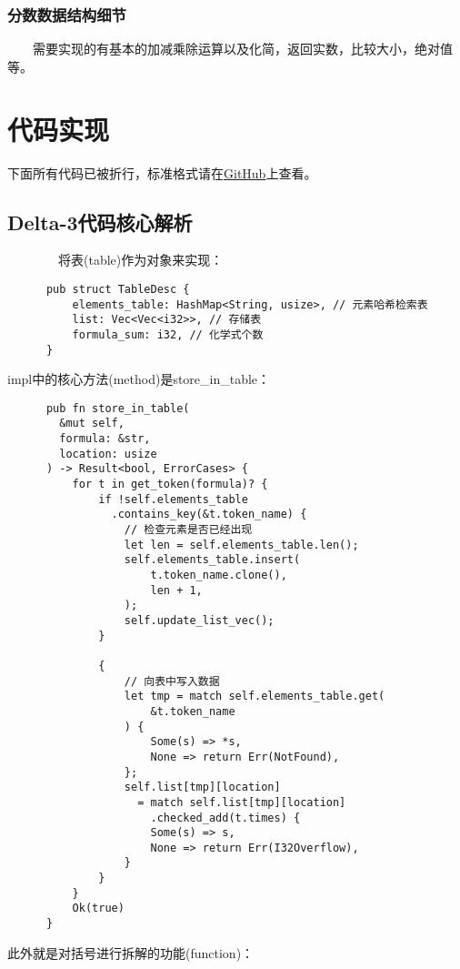 \documentclass[1pt]{article}
\begin{document}
    \subsubsection{分数数据结构细节}
      　　需要实现的有基本的加减乘除运算以及化简，返回实数，比较大小，绝对值等。
  \section{代码实现}
    下面所有代码已被折行，标准格式请在\href{https://github.com/LEXUGE/lib-xch-ceb}{GitHub}上查看。
    \subsection{Delta-3代码核心解析}
　　　　将表(table)作为对象来实现：\\
      \begin{lstlisting}
      pub struct TableDesc {
          elements_table: HashMap<String, usize>, // 元素哈希检索表
          list: Vec<Vec<i32>>, // 存储表
          formula_sum: i32, // 化学式个数
      }
      \end{lstlisting}
      impl中的核心方法(method)是store\_in\_table：
      \begin{lstlisting}
      pub fn store_in_table(
        &mut self,
        formula: &str,
        location: usize
      ) -> Result<bool, ErrorCases> {
          for t in get_token(formula)? {
              if !self.elements_table
                .contains_key(&t.token_name) {
                  // 检查元素是否已经出现
                  let len = self.elements_table.len();
                  self.elements_table.insert(
                      t.token_name.clone(),
                      len + 1,
                  );
                  self.update_list_vec();
              }

              {
                  // 向表中写入数据
                  let tmp = match self.elements_table.get(
                      &t.token_name
                  ) {
                      Some(s) => *s,
                      None => return Err(NotFound),
                  };
                  self.list[tmp][location]
                    = match self.list[tmp][location]
                      .checked_add(t.times) {
                      Some(s) => s,
                      None => return Err(I32Overflow),
                  }
              }
          }
          Ok(true)
      }
      \end{lstlisting}
      此外就是对括号进行拆解的功能(function)：
\end{document}

